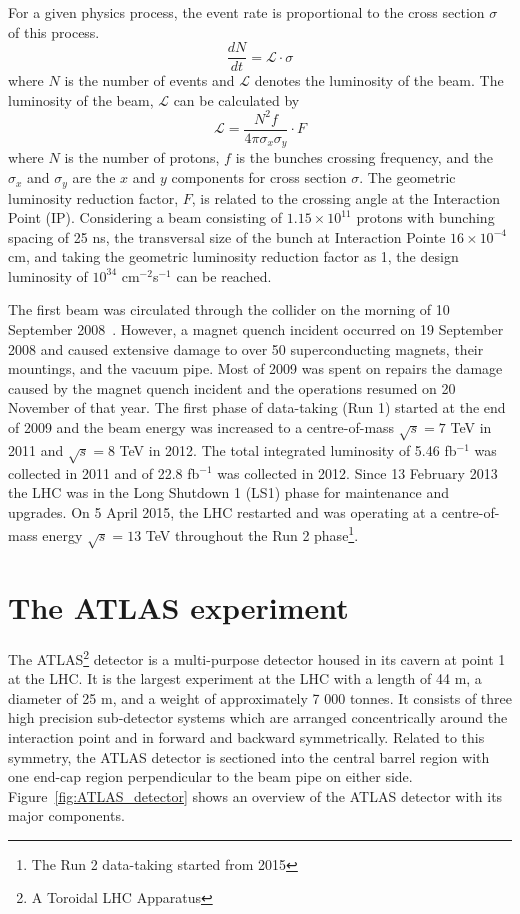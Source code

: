 For a given physics process, the event rate is proportional to the cross section $\sigma$ of this process.
\begin{equation}
\frac{dN}{dt} = \mathcal{L}\cdot\sigma
\end{equation}
where $N$ is the number of events and $\mathcal{L}$ denotes the luminosity of the beam.
The luminosity of the beam, $\mathcal{L}$ can be calculated by
\begin{equation}
\mathcal{L} = \frac{N^{2} f}{4 \pi \sigma_{x} \sigma_{y}} \cdot F
\end{equation}
where $N$ is the number of protons, $f$ is the bunches crossing frequency, and the $\sigma_{x}$ and $\sigma_{y}$ are the $x$ and $y$ components for cross section $\sigma$.
The geometric luminosity reduction factor, $F$, is related to the crossing angle at the Interaction Point (IP).
Considering a beam consisting of $1.15 \times 10^{11}$ protons with bunching spacing of 25 ns, the transversal size of the bunch at Interaction Pointe $16\times 10^{-4}$ cm, and taking the geometric luminosity reduction factor as 1, the design luminosity of $10^{34}$ cm$^{-2}$s$^{-1}$ can be reached.

The first beam was circulated through the collider on the morning of 10 September 2008~\cite{CERN-COURIER-Sep192008}.
However, a magnet quench incident occurred on 19 September 2008 and caused extensive damage to over 50 superconducting magnets, their mountings, and the vacuum pipe.
Most of 2009 was spent on repairs the damage caused by the magnet quench incident and the operations resumed on 20 November of that year.
The first phase of data-taking (Run 1) started at the end of 2009 and the beam energy was increased to a centre-of-mass $\sqrt{s}=7$ TeV in 2011 and $\sqrt{s} = 8$ TeV in 2012.
The total integrated luminosity of 5.46 fb$^{-1}$ was collected in 2011 and of 22.8 fb$^{-1}$ was collected in 2012.
Since 13 February 2013 the LHC was in the Long Shutdown 1 (LS1) phase for maintenance and upgrades.
On 5 April 2015, the LHC restarted and was operating at a centre-of-mass energy $\sqrt{s}=13$ TeV throughout the Run 2 phase\footnote{The Run 2 data-taking started from 2015}.



\section{The ATLAS experiment}

The ATLAS\footnote{A Toroidal LHC Apparatus} detector is a multi-purpose detector housed in its cavern at point 1 at the LHC.
It is the largest experiment at the LHC with a length of 44 m, a diameter of 25 m, and a weight of approximately 7 000 tonnes.
It consists of three high precision sub-detector systems which are arranged concentrically around the interaction point and in forward and backward symmetrically.
Related to this symmetry, the ATLAS detector is sectioned into the central barrel region with one end-cap region perpendicular to the beam pipe on either side.
Figure~\ref{fig:ATLAS_detector} shows an overview of the ATLAS detector with its major components.

